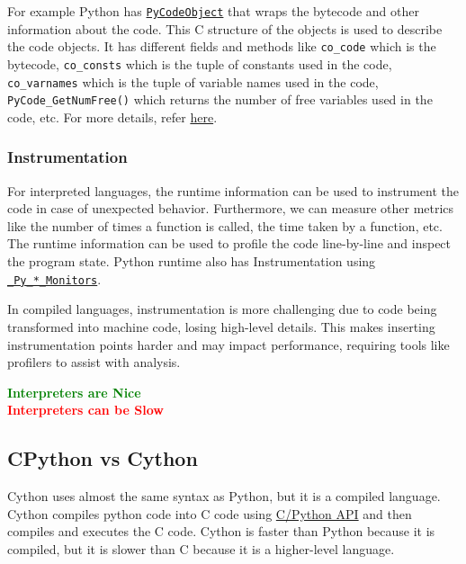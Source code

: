 \documentclass[11pt,paper=a4,answers]{exam}
\begin{document}
For example Python has \href{https://github.com/python/cpython/blob/main/Python/assemble.c} {\texttt{PyCodeObject}} that wraps the bytecode and other information about the code. This C structure of the objects is used to describe the code objects. It has different fields and methods like \texttt{co\_code} which is the bytecode, \texttt{co\_consts} which is the tuple of constants used in the code, \texttt{co\_varnames} which is the tuple of variable names used in the code, \texttt{PyCode\_GetNumFree()} which returns the number of free variables used in the code, etc.
 For more details, refer \href{https://docs.python.org/3/c-api/code.html}{here}.
\subsubsection{Instrumentation}
For interpreted languages, the runtime information can be used to instrument the code in case of unexpected behavior. Furthermore, we can measure other metrics like the number of times a function is called, the time taken by a function, etc. The runtime information can be used to profile the code line-by-line and inspect the program state. Python runtime also has Instrumentation using \href{https://github.com/python/cpython/blob/main/Include/cpython/code.h}{\texttt{\_Py\_*\_Monitors}}. 

In compiled languages, instrumentation is more challenging due to code being transformed into machine code, losing high-level details. This makes inserting instrumentation points harder and may impact performance, requiring tools like profilers to assist with analysis.


\begin{tcolorbox}[fontupper=\large]
    \begin{center}
        \textcolor{green}{\textbf{Interpreters are Nice}} \\
        \textcolor{red}{\textbf{Interpreters can be Slow}}
    \end{center}
\end{tcolorbox}

\subsection{CPython vs Cython}
Cython uses almost the same syntax as Python, but it is a compiled language. Cython compiles python code into C code using \href{https://docs.python.org/3/c-api/}{C/Python API} and then compiles and executes the C code. Cython is faster than Python because it is compiled, but it is slower than C because it is a higher-level language.
\end{document}
